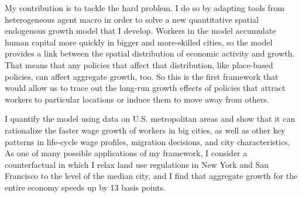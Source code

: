 \documentclass{jmstatement}
\begin{document}
My contribution is to tackle the hard problem.
I do so by adapting tools from heterogeneous agent macro in order to solve
a new quantitative spatial endogenous growth model that I develop.
Workers in the model accumulate human capital more quickly in bigger
and more-skilled cities,
so the model provides a link between the spatial distribution of economic
activity and growth.
That means that any policies that affect that distribution, like place-based policies,
can affect aggregate growth, too.
So this is the first framework that would allow us to trace out the long-run
growth effects of policies that attract workers to particular locations or
induce them to move away from others.

I quantify the model using data on U.S. metropolitan areas
and show that it can rationalize the faster wage growth of workers in big cities,
as well as other key patterns in life-cycle wage profiles, migration decisions,
and city characteristics.
As one of many possible applications of my framework,
I consider a counterfactual in which I relax land use regulations
in New York and San Francisco to the level of the median city, and I find that
aggregate growth for the entire economy speeds up by 13 basis points.


\end{document}
